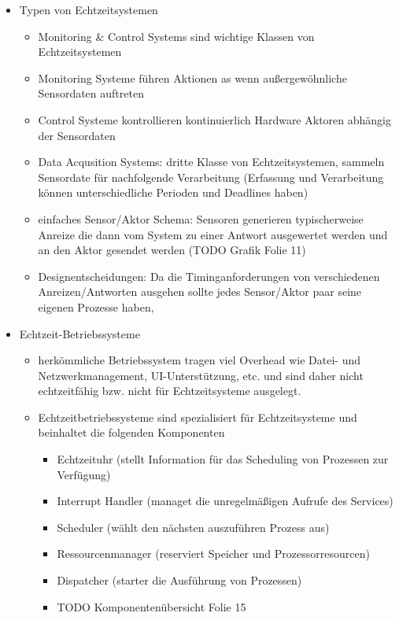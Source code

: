 \documentclass[paper=a4, fontsize=11pt]{scrartcl} %
\numberwithin{equation}{section} %
\numberwithin{figure}{section} %
\numberwithin{table}{section} %
\begin{document}
\begin{itemize}
\begin{itemize}
  \end{itemize}
  \item Typen von Echtzeitsystemen
  \begin{itemize}
    \item Monitoring \& Control Systems sind wichtige Klassen von Echtzeitsystemen
    \item Monitoring Systeme führen Aktionen as wenn außergewöhnliche Sensordaten auftreten
    \item Control Systeme kontrollieren kontinuierlich Hardware Aktoren abhängig der Sensordaten
    \item Data Acqusition Systems: dritte Klasse von Echtzeitsystemen, sammeln Sensordate für nachfolgende Verarbeitung (Erfassung und Verarbeitung können unterschiedliche Perioden und Deadlines haben)
    \item einfaches Sensor/Aktor Schema: Sensoren generieren typischerweise Anreize die dann vom System zu einer Antwort ausgewertet werden und an den Aktor gesendet werden (TODO Grafik Folie 11)
    \item Designentscheidungen: Da die Timinganforderungen von verschiedenen Anreizen/Antworten ausgehen sollte jedes Sensor/Aktor paar seine eigenen Prozesse haben,
  \end{itemize}
  \item Echtzeit-Betriebssysteme
  \begin{itemize}
    \item herkömmliche Betriebssystem tragen viel Overhead wie Datei- und Netzwerkmanagement, UI-Unterstützung, etc. und sind daher nicht echtzeitfähig bzw. nicht für Echtzeitsysteme ausgelegt.
    \item Echtzeitbetriebssysteme sind spezialisiert für Echtzeitsysteme und beinhaltet die folgenden Komponenten
    \begin{itemize}
      \item Echtzeituhr (stellt Information für das Scheduling von Prozessen zur Verfügung)
      \item Interrupt Handler (managet die unregelmäßigen Aufrufe des Services)
      \item Scheduler (wählt den nächsten auszuführen Prozess aus)
      \item Ressourcenmanager (reserviert Speicher und Prozessorresourcen)
      \item Dispatcher (starter die Ausführung von Prozessen)
      \item TODO Komponentenübersicht Folie 15
    \end{itemize}

\end{itemize}
\end{itemize}
\end{document}

